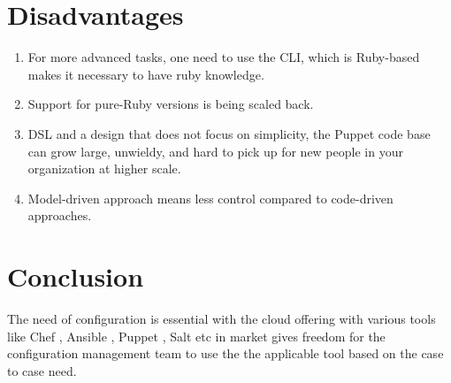 \documentclass[9pt,twocolumn,twoside]{../../styles/osajnl}
\begin{document}
\section{Disadvantages}

\begin{enumerate}

\item For more advanced tasks, one need to use the CLI, which is
Ruby-based makes it necessary to have ruby knowledge.
\item Support for pure-Ruby versions is being scaled back.
\item DSL and a design that does not focus on
simplicity, the Puppet code base can grow large, unwieldy, and hard to
pick up for new people in your organization at higher scale.
\item Model-driven approach means less control compared to code-driven
approaches.\cite{www-intigue} 

\end{enumerate}

\section{Conclusion}

The need of configuration is essential with the cloud offering with
various tools like Chef , Ansible , Puppet , Salt etc in market gives
freedom for the configuration management team to use the the
applicable tool based on the case to case need.





 

\newpage

\appendix
\end{document}
